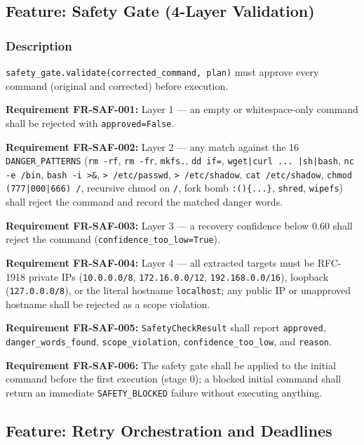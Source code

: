 \documentclass[10pt,journal,onecolumn]{IEEEtran}
\newcommand{\reqid}[1]{\textbf{#1}}
\begin{document}
\subsection{Feature: Safety Gate (4-Layer Validation)}

\subsubsection{Description}

\texttt{safety\_\allowbreak gate.\allowbreak validate(corrected\_\allowbreak command, plan)} must approve every command (original and corrected) before execution.

\reqid{Requirement FR-SAF-001:} Layer 1 --- an empty or whitespace-only command shall be rejected with \texttt{approved=False}.

\reqid{Requirement FR-SAF-002:} Layer 2 --- any match against the 16 \texttt{DANGER\_PATTERNS} (\texttt{rm -rf}, \texttt{rm -fr}, \texttt{mkfs.}, \texttt{dd if=}, \texttt{wget|curl ... |sh|bash}, \texttt{nc -e /bin}, \texttt{bash -i >\&}, \texttt{> /etc/passwd}, \texttt{> /etc/shadow}, \texttt{cat /etc/shadow}, \texttt{chmod (777|000|666) /}, recursive chmod on \texttt{/}, fork bomb \texttt{:()\{...\}}, \texttt{shred}, \texttt{wipefs}) shall reject the command and record the matched danger words.

\reqid{Requirement FR-SAF-003:} Layer 3 --- a recovery confidence below 0.60 shall reject the command (\texttt{confidence\_\allowbreak too\_\allowbreak low=True}).

\reqid{Requirement FR-SAF-004:} Layer 4 --- all extracted targets must be RFC-1918 private IPs (\texttt{10.0.0.0/8}, \texttt{172.16.0.0/12}, \texttt{192.168.0.0/16}), loopback (\texttt{127.0.0.0/8}), or the literal hostname \texttt{localhost}; any public IP or unapproved hostname shall be rejected as a scope violation.

\reqid{Requirement FR-SAF-005:} \texttt{SafetyCheckResult} shall report \texttt{approved}, \texttt{danger\_words\_found}, \texttt{scope\_violation}, \texttt{confidence\_too\_low}, and \texttt{reason}.

\reqid{Requirement FR-SAF-006:} The safety gate shall be applied to the initial command before the first execution (stage 0); a blocked initial command shall return an immediate \texttt{SAFETY\_BLOCKED} failure without executing anything.

\subsection{Feature: Retry Orchestration and Deadlines}
\end{document}
